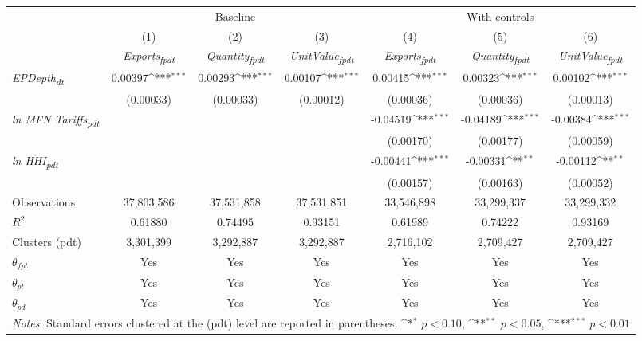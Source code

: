 {
\def\sym#1{\ifmmode^{#1}\else\(^{#1}\)\fi}
\begin{tabular}{l*{6}{c}}
\toprule
&\multicolumn{3}{c}{Baseline}&\multicolumn{3}{c}{With controls}\\\cmidrule(lr){2-4}\cmidrule(lr){5-7}
&(1)&(2)&(3)&(4)&(5)&(6)\\
&\textit{Exports\textsubscript{fpdt}}&\textit{Quantity\textsubscript{fpdt}}&\textit{UnitValue\textsubscript{fpdt}}&\textit{Exports\textsubscript{fpdt}}&\textit{Quantity\textsubscript{fpdt}}&\textit{UnitValue\textsubscript{fpdt}}\\
\midrule
\textit{EPDepth\textsubscript{dt}} & 0.00397\sym{***} & 0.00293\sym{***} & 0.00107\sym{***} & 0.00415\sym{***} & 0.00323\sym{***} & 0.00102\sym{***}\\
 & (0.00033) & (0.00033) & (0.00012) & (0.00036) & (0.00036) & (0.00013)\\
\addlinespace
\textit{ln MFN Tariffs\textsubscript{pdt}} &  &  &  & -0.04519\sym{***} & -0.04189\sym{***} & -0.00384\sym{***}\\
 &  &  &  & (0.00170) & (0.00177) & (0.00059)\\
\addlinespace
\textit{ln HHI\textsubscript{pdt}} &  &  &  & -0.00441\sym{***} & -0.00331\sym{**} & -0.00112\sym{**}\\
 &  &  &  & (0.00157) & (0.00163) & (0.00052)\\
\midrule
Observations & 37,803,586 & 37,531,858 & 37,531,851 & 33,546,898 & 33,299,337 & 33,299,332\\
$R^{2}$ & 0.61880 & 0.74495 & 0.93151 & 0.61989 & 0.74222 & 0.93169\\
Clusters (pdt) & 3,301,399 & 3,292,887 & 3,292,887 & 2,716,102 & 2,709,427 & 2,709,427\\
$\theta_{fpt}$ & Yes & Yes & Yes & Yes & Yes & Yes\\
$\theta_{pt}$ & Yes & Yes & Yes & Yes & Yes & Yes\\
$\theta_{pd}$ & Yes & Yes & Yes & Yes & Yes & Yes\\
\bottomrule
\multicolumn{7}{l}{\footnotesize \textit{Notes}: Standard errors clustered at the (pdt) level are reported in parentheses. \sym{*} \(p<0.10\), \sym{**} \(p<0.05\), \sym{***} \(p<0.01\)}\\
\end{tabular}
}
